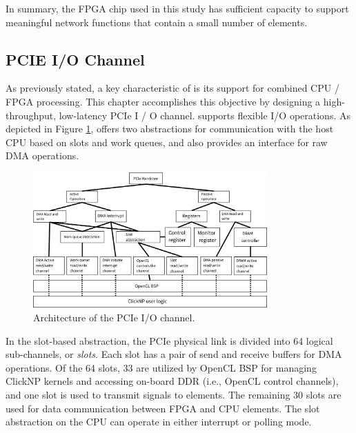 In summary, the FPGA chip used in this study has sufficient capacity to support meaningful network functions that contain a small number of elements.

\subsection{PCIE I/O Channel}
\label{clicknp:subsec:pcie}

As previously stated, a key characteristic of \name is its support for combined CPU / FPGA processing. This chapter accomplishes this objective by designing a high-throughput, low-latency PCIe I / O channel. \name supports flexible I/O operations. As depicted in Figure \ref{clicknp:fig:pcie-io}, \name offers two abstractions for communication with the host CPU based on slots and work queues, and also provides an interface for raw DMA operations.

\begin{figure}[htbp]
	\centering
	\includegraphics[width=0.8\textwidth]{image/pcie-io}
	\caption{Architecture of the PCIe I/O channel.}
	\label{clicknp:fig:pcie-io}
\end{figure}

In the slot-based abstraction, the PCIe physical link is divided into 64 logical sub-channels, or \textit {slots}. Each slot has a pair of send and receive buffers for DMA operations. Of the 64 slots, 33 are utilized by OpenCL BSP for managing ClickNP kernels and accessing on-board DDR (i.e., OpenCL control channels), and one slot is used to transmit signals to \name elements. The remaining 30 slots are used for data communication between FPGA and CPU elements. The slot abstraction on the CPU can operate in either interrupt or polling mode.

